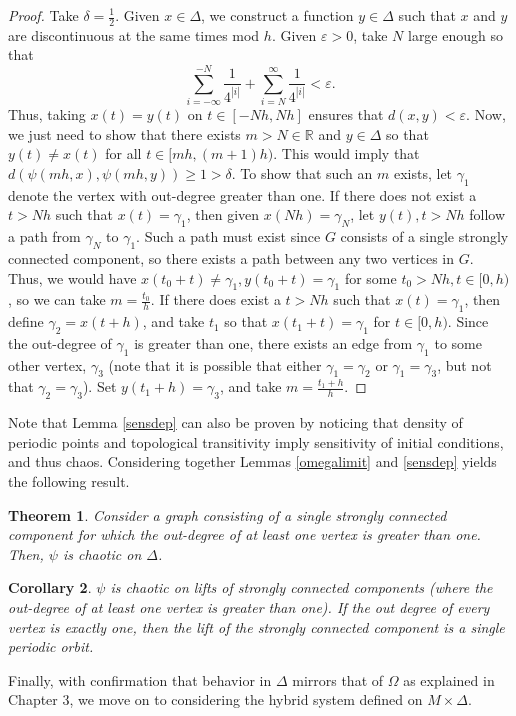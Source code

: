 \documentclass[11pt]{article}
\newtheorem{thm}{Theorem}
\newtheorem{cor}[thm]{Corollary}
\begin{document}
\begin{proof}
Take $\delta = \frac{1}{2}$.  Given $x \in \Delta$, we construct a function $y \in \Delta$ such that $x$ and $y$ are discontinuous at the same times mod $h$.  Given $\varepsilon > 0$, take $N$ large enough so that
$$\displaystyle \sum_{i=-\infty}^{-N}{\frac{1}{4^{|i|}}} + \displaystyle \sum_{i=N}^{\infty}{\frac{1}{4^{|i|}}} < \varepsilon.$$
Thus, taking $x(t) = y(t)$ on $t \in [-Nh,Nh]$ ensures that $d(x,y) < \varepsilon$.  Now, we just need to show that there exists $m>N \in \mathbb{R}$ and $y\in \Delta$ so that $y(t) \neq x(t)$ for all $t \in [mh,(m+1)h)$.  This would imply that $d(\psi(mh,x),\psi(mh,y)) \geq 1 > \delta$.
To show that such an $m$ exists, let $\gamma_1$ denote the vertex with out-degree greater than one.  If there does not exist a $t > Nh$ such that $x(t) = \gamma_1$, then given $x(Nh) = \gamma_N$, let $y(t), t > Nh$ follow a path from $\gamma_N$ to $\gamma_1$.  Such a path must exist since $G$ consists of a single strongly connected component, so there exists a path between any two vertices in $G$.  Thus, we would have $x(t_0+t) \neq \gamma_1, y(t_0+t) = \gamma_1$ for some $t_0 > Nh, t \in [0,h)$, so we can take $m = \frac{t_0}{h}$. If there does exist a $t > Nh$ such that $x(t) = \gamma_1$, then define $\gamma_2 = x(t+h)$, and take $t_1$ so that $x(t_1+t)=\gamma_1$ for $t \in [0,h)$.  Since the out-degree of $\gamma_1$ is greater than one, there exists an edge from $\gamma_1$ to some other vertex, $\gamma_3$ (note that it is possible that either $\gamma_1 = \gamma_2$ or $\gamma_1 = \gamma_3$, but not that $\gamma_2 = \gamma_3$).  Set $y(t_1+h) = \gamma_3$, and take $m = \frac{t_1+h}{h}$.

\end{proof}

Note that Lemma \ref{sensdep} can also be proven by noticing that density of periodic points and topological transitivity imply sensitivity of initial conditions, and thus chaos. Considering together Lemmas \ref{omegalimit} and \ref{sensdep} yields the following result.
\begin{thm}\label{chaos}
Consider a graph consisting of a single strongly connected component for which the out-degree of at least one vertex is greater than one.  Then, $\psi$ is chaotic on $\Delta$.
\end{thm}
\begin{cor}
$\psi$ is chaotic on lifts of strongly connected components (where the out-degree of at least one vertex is greater than one).  If the out degree of every vertex is exactly one, then the lift of the strongly connected component is a single periodic orbit. 
\end{cor}
Finally, with confirmation that behavior in $\Delta$ mirrors that of $\Omega$ as explained in Chapter 3, we move on to considering the hybrid system defined on $M\times\Delta$. 
\end{document}
